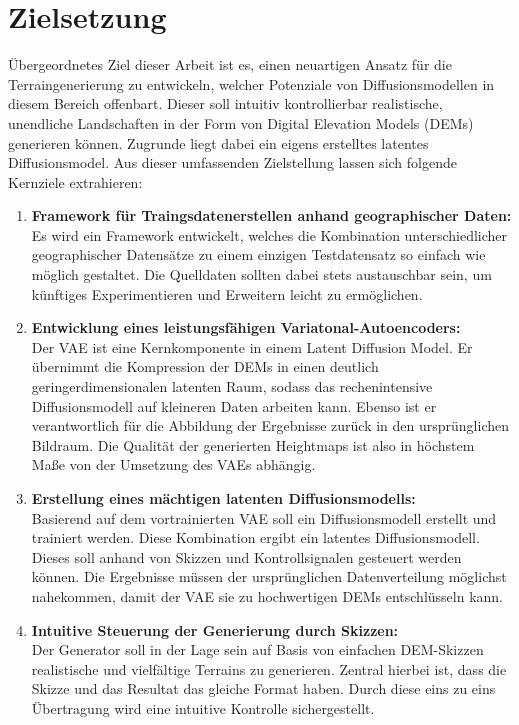 \section{Zielsetzung}
\label{sec:Zielsetzung}

Übergeordnetes Ziel dieser Arbeit ist es, einen neuartigen Ansatz für die Terraingenerierung zu entwickeln, welcher Potenziale von Diffusionsmodellen in diesem Bereich offenbart. Dieser soll intuitiv kontrollierbar realistische, unendliche Landschaften in der Form von Digital Elevation Models (DEMs)  generieren können. Zugrunde liegt dabei ein eigens erstelltes latentes Diffusionsmodel. Aus dieser umfassenden Zielstellung lassen sich folgende Kernziele extrahieren:

\begin{enumerate}
    \item \textbf {Framework für Traingsdatenerstellen anhand geographischer Daten:} \\
    Es wird ein Framework entwickelt, welches die Kombination unterschiedlicher geographischer Datensätze zu einem einzigen Testdatensatz so einfach wie möglich gestaltet. Die Quelldaten sollten dabei stets austauschbar sein, um künftiges Experimentieren und Erweitern leicht zu ermöglichen.

    \item \textbf {Entwicklung eines leistungsfähigen Variatonal-Autoencoders:} \\
    Der \ac{VAE} ist eine Kernkomponente in einem Latent Diffusion Model. Er übernimmt die Kompression der \ac{DEM}s in einen deutlich geringerdimensionalen latenten Raum, sodass das rechenintensive Diffusionsmodell auf kleineren Daten arbeiten kann. Ebenso ist er verantwortlich für die Abbildung der Ergebnisse zurück in den ursprünglichen Bildraum. Die Qualität der generierten Heightmaps ist also in höchstem Maße von der Umsetzung des \ac{VAE}s abhängig.

    \item \textbf {Erstellung eines mächtigen latenten Diffusionsmodells:} \\
    Basierend auf dem vortrainierten \ac{VAE} soll ein Diffusionsmodell erstellt und trainiert werden. Diese Kombination ergibt ein latentes Diffusionsmodell. Dieses soll anhand von Skizzen und Kontrollsignalen gesteuert werden können. Die Ergebnisse müssen der ursprünglichen Datenverteilung möglichst nahekommen, damit der \ac{VAE} sie zu hochwertigen \ac{DEM}s entschlüsseln kann.
    
    \item \textbf {Intuitive Steuerung der Generierung durch Skizzen:} \\
    Der Generator soll in der Lage sein auf Basis von einfachen \ac{DEM}-Skizzen realistische und vielfältige Terrains zu generieren. Zentral hierbei ist, dass die Skizze und das Resultat das gleiche Format haben. Durch diese eins zu eins Übertragung wird eine intuitive Kontrolle sichergestellt.


\end{enumerate}

